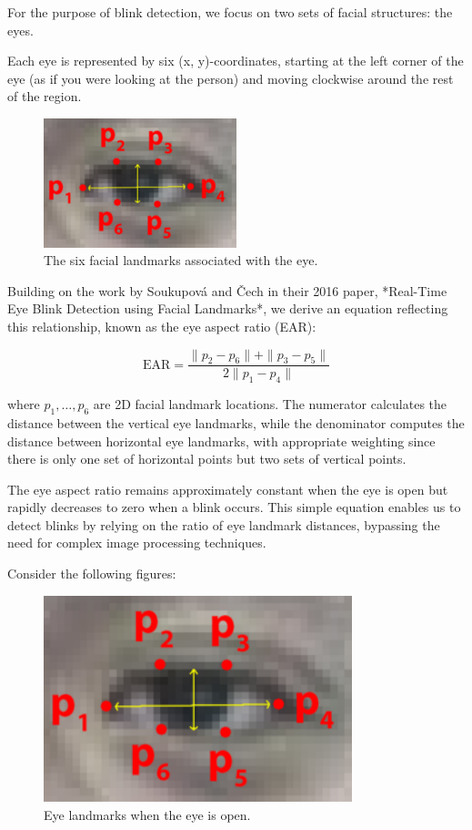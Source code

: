 For the purpose of blink detection, we focus on two sets of facial structures: the eyes.

Each eye is represented by six (x, y)-coordinates, starting at the left corner of the eye (as if you were looking at the person) and moving clockwise around the rest of the region.

\begin{figure}[H]
    \centering
    \includegraphics[width=0.5\textwidth]{Images/1_AI/6points_open_eye.png}
    \caption{The six facial landmarks associated with the eye.}
    \label{fig:6points_open_eye}
\end{figure}

Building on the work by Soukupová and Čech in their 2016 paper, *Real-Time Eye Blink Detection using Facial Landmarks*, we derive an equation reflecting this relationship, known as the eye aspect ratio (EAR):

\begin{equation}
\text{EAR} = \frac{\|p_2 - p_6\| + \|p_3 - p_5\|}{2 \|p_1 - p_4\|}
\end{equation}

where \( p_1, \ldots, p_6 \) are 2D facial landmark locations. The numerator calculates the distance between the vertical eye landmarks, while the denominator computes the distance between horizontal eye landmarks, with appropriate weighting since there is only one set of horizontal points but two sets of vertical points.

The eye aspect ratio remains approximately constant when the eye is open but rapidly decreases to zero when a blink occurs. This simple equation enables us to detect blinks by relying on the ratio of eye landmark distances, bypassing the need for complex image processing techniques.

Consider the following figures:

\begin{figure}[H]
    \centering
    \includegraphics[width=0.8\textwidth]{Images/1_AI/6points_open_eye.png}
    \caption{Eye landmarks when the eye is open.}
    \label{fig:6points_open_eye}
\end{figure}

